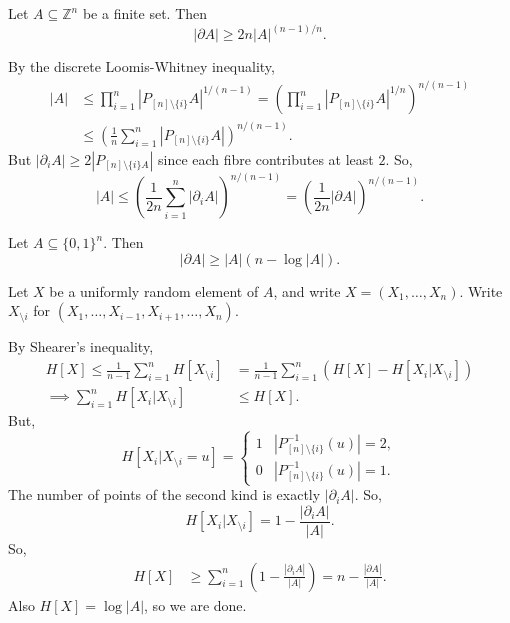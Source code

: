 \documentclass[12pt]{article}
\begin{document}
\begin{theorem}
	Let $A \subseteq \mathbb{Z}^{n}$ be a finite set. Then
	\[
	|\partial A| \geq 2n |A|^{(n-1)/n}.
	\]
\end{theorem}

\begin{proofbox}
 	By the discrete Loomis-Whitney inequality,
	\begin{align*}
		|A| &\leq \prod_{i = 1}^{n} |P_{[n] \setminus \{i\}} A|^{1/(n-1)} = \left( \prod_{i= 1}^{n} |P_{[n] \setminus \{i\}} A|^{1/n} \right)^{n/(n-1)} \\
		    &\leq \left( \frac1n \sum_{i = 1}^{n} |P_{[n]\setminus\{i\}} A| \right)^{n/(n-1)}.
	\end{align*}
	But $|\partial_i A| \geq 2 |P_{[n] \setminus \{i\} A}|$ since each fibre contributes at least $2$. So,
	\[
	|A| \leq \left( \frac{1}{2n} \sum_{i =1}^{n} |\partial_i A| \right)^{n/(n-1)} = \left( \frac{1}{2n} |\partial A| \right)^{n/(n-1)}.
	\]
\end{proofbox}

\begin{theorem}
	Let $A \subseteq \{0, 1\}^{n}$. Then
	\[
	|\partial A| \geq |A| (n - \log |A|).
	\]
\end{theorem}

\begin{proofbox}
	Let $X$ be a uniformly random element of $A$, and write $X = (X_1, \ldots, X_n)$. Write $X_{\setminus i}$ for $(X_1, \ldots, X_{i-1}, X_{i+1}, \ldots, X_n)$.

	By Shearer's inequality,
	\begin{align*}
		H[X] \leq \frac{1}{n-1} \sum_{i = 1}^{n} H[X_{\setminus i}] &= \frac{1}{n-1} \sum_{i = 1}^{n} \left( H[X] - H[X_i|X_{\setminus i}] \right) \\
		\implies \sum_{i = 1}^{n} H[X_i | X_{\setminus i}] &\leq H[X].
	\end{align*}
	But,
	\[
		H[X_i | X_{\setminus i} = u] =
		\begin{cases}
			1 & |P_{[n]\setminus\{i\}}^{-1}(u)| = 2, \\
			0 & |P_{[n]\setminus\{i\}}^{-1}(u)| = 1.

		\end{cases}		
	\]
	The number of points of the second kind is exactly $|\partial_i A|$. So,
	\[
		H[X_i | X_{\setminus i}] = 1 - \frac{|\partial_i A|}{|A|}.
	\]
	So,
	\begin{align*}
		H[X] &\geq \sum_{i = 1}^{n} \left(1 - \frac{|\partial_i A|}{|A| } \right) = n - \frac{|\partial A|}{|A|}.
	\end{align*}
	Also $H[X] = \log |A|$, so we are done.
	
\end{proofbox}
\end{document}
